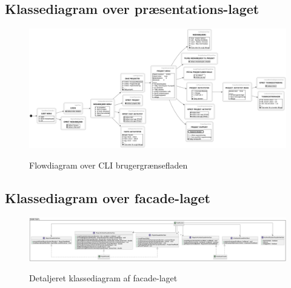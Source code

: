\begin{landscape}
    \section{Klassediagram over præsentations-laget}\label{apdx:classDiagram_presentation}
    \begin{figure}[H]
        \centering
        \caption{Flowdiagram over CLI brugergrænsefladen}
        \includegraphics[width = \linewidth, keepaspectratio]{TaskFusion/out/assets/diagrams/flow_cli/flow_cli.png}
        \label{fig:flow_cli_big}
    \end{figure}
\end{landscape}

\begin{landscape}
    \section{Klassediagram over facade-laget}\label{apdx:classDiagram_facade_full}
    \begin{figure}[H]
        \centering
        \caption{Detaljeret klassediagram af facade-laget}
        \includegraphics[width = \linewidth, keepaspectratio]{TaskFusion/out/assets/diagrams/class_facade_layer_full/ClassDiagram_facade_full.png}
        \label{fig:class_facade_full}
    \end{figure}
\end{landscape}

